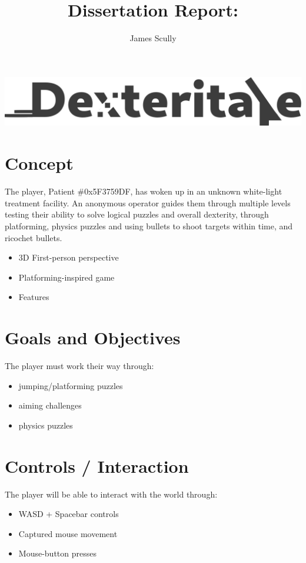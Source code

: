 \documentclass[11pt]{article}
\title{Dissertation Report: \pt}
\author{James Scully}
\begin{document}
\begin{center}
\includegraphics[width=0.75\linewidth]{logo} 
\end{center}

\section*{Concept}
The player, Patient \#0x5F3759DF, has woken up in an unknown white-light treatment facility. An anonymous operator guides them through multiple levels testing their ability to solve logical puzzles and overall dexterity, through platforming, physics puzzles and using bullets to shoot targets within time, and ricochet bullets.

\begin{itemize}
	\item 3D First-person perspective 
	\item Platforming-inspired game
	\item Features
\end{itemize}

\section*{Goals and Objectives}
The player must work their way through:

\begin{itemize}
	\item jumping/platforming puzzles
	\item aiming challenges 
	\item physics puzzles
\end{itemize}

\section*{Controls / Interaction}
The player will be able to interact with the world through:
\begin{itemize}
	\item WASD + Spacebar controls 
	\item Captured mouse movement
	\item Mouse-button presses \\
\end{itemize}
\end{document}
